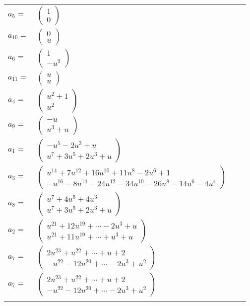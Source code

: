 \documentclass[1p]{elsarticle_modified}
\theoremstyle{definition}
\begin{document}
\begin{tabular}{m{7pt} m{180pt} m{7pt} m{180pt} }
\flushright $a_{5}=$&$\begin{pmatrix}1\\0\end{pmatrix}$ \\
\flushright $a_{10}=$&$\begin{pmatrix}0\\u\end{pmatrix}$ \\
\flushright $a_{6}=$&$\begin{pmatrix}1\\- u^2\end{pmatrix}$ \\
\flushright $a_{11}=$&$\begin{pmatrix}u\\u\end{pmatrix}$ \\
\flushright $a_{4}=$&$\begin{pmatrix}u^2+1\\u^2\end{pmatrix}$ \\
\flushright $a_{9}=$&$\begin{pmatrix}- u\\u^3+u\end{pmatrix}$ \\
\flushright $a_{1}=$&$\begin{pmatrix}- u^5-2 u^3+u\\u^7+3 u^5+2 u^3+u\end{pmatrix}$ \\
\flushright $a_{3}=$&$\begin{pmatrix}u^{14}+7 u^{12}+16 u^{10}+11 u^8-2 u^6+1\\- u^{16}-8 u^{14}-24 u^{12}-34 u^{10}-26 u^8-14 u^6-4 u^4\end{pmatrix}$ \\
\flushright $a_{8}=$&$\begin{pmatrix}u^7+4 u^5+4 u^3\\u^7+3 u^5+2 u^3+u\end{pmatrix}$ \\
\flushright $a_{2}=$&$\begin{pmatrix}u^{21}+12 u^{19}+\cdots-2 u^3+u\\u^{21}+11 u^{19}+\cdots+u^3+u\end{pmatrix}$ \\
\flushright $a_{7}=$&$\begin{pmatrix}2 u^{23}+u^{22}+\cdots+u+2\\- u^{22}-12 u^{20}+\cdots-2 u^3+u^2\end{pmatrix}$\\ \flushright $a_{7}=$&$\begin{pmatrix}2 u^{23}+u^{22}+\cdots+u+2\\- u^{22}-12 u^{20}+\cdots-2 u^3+u^2\end{pmatrix}$\\&\end{tabular}
\end{document}
